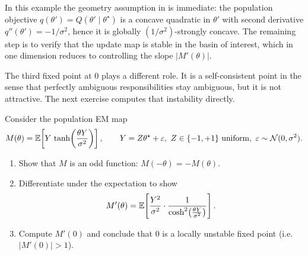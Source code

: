 \documentclass[11pt]{article}
\newif\ifshowsolutions
\newcommand{\SolutionBox}[2][10]{%
  \ifshowsolutions
    \begin{tcolorbox}[stat221panelgray,title={Solution}]
    #2
    \end{tcolorbox}
  \else
    \begin{tcolorbox}[stat221panelgray,unbreakable,title={Workspace}]
    \vspace{#1\baselineskip}
    \end{tcolorbox}
  \fi
}
\begin{document}
In this example the geometry assumption in  is immediate:
the population objective $q(\theta')=Q(\theta'\mid\theta^\star)$ is a concave quadratic in $\theta'$ with second derivative $q''(\theta')=-1/\sigma^2$, hence it is globally $(1/\sigma^2)$-strongly concave.
The remaining step is to verify that the update map is stable in the basin of interest, which in one dimension reduces to controlling the slope $|M'(\theta)|$.

The third fixed point at $0$ plays a different role.
It is a self-consistent point in the sense that perfectly ambiguous responsibilities stay ambiguous, but it is not attractive.
The next exercise computes that instability directly.

\begin{exercise}
\label{ex:gmm-zero-unstable}
Consider the population EM map
\[
M(\theta)=\E\!\left[Y\,\tanh\!\left(\frac{\theta Y}{\sigma^2}\right)\right],
\qquad
Y=Z\theta^\star+\varepsilon,\ Z\in\{-1,+1\}\text{ uniform},\ \varepsilon\sim\mathcal{N}(0,\sigma^2).
\]
\begin{enumerate}[leftmargin=*]
  \item Show that $M$ is an odd function: $M(-\theta)=-M(\theta)$.
  \item Differentiate under the expectation to show
  \[
  M'(\theta)=\mathbb{E}\!\left[\frac{Y^2}{\sigma^2}\cdot \frac{1}{\cosh^2\!\left(\frac{\theta Y}{\sigma^2}\right)}\right].
  \]
  \item Compute $M'(0)$ and conclude that $0$ is a locally unstable fixed point (i.e.\ $|M'(0)|>1$).
\end{enumerate}
\end{exercise}

\SolutionBox[14]{%
\emph{Part (1).}
Using that $\tanh$ is odd,
\[
M(-\theta)
=\E\!\left[Y\,\tanh\!\left(-\frac{\theta Y}{\sigma^2}\right)\right]
=-\E\!\left[Y\,\tanh\!\left(\frac{\theta Y}{\sigma^2}\right)\right]
=-M(\theta).
\]

\emph{Part (2).}
Since $\frac{d}{du}\tanh(u)=\cosh^{-2}(u)$ and $\tanh,\cosh^{-2}$ are bounded, dominated convergence justifies differentiation under the expectation:
\[
M'(\theta)
=\E\!\left[Y\cdot \frac{Y}{\sigma^2}\cdot \frac{1}{\cosh^2\!\left(\frac{\theta Y}{\sigma^2}\right)}\right]
=\E\!\left[\frac{Y^2}{\sigma^2}\cdot \frac{1}{\cosh^2\!\left(\frac{\theta Y}{\sigma^2}\right)}\right].
\]

\emph{Part (3).}
At $\theta=0$, $\cosh^2(0)=1$, so $M'(0)=\E[Y^2]/\sigma^2$.
Under $Y=Z\theta^\star+\varepsilon$ with $Z^2=1$ and $\varepsilon\perp Z$,
\[
\E[Y^2]=\E[(Z\theta^\star+\varepsilon)^2]=(\theta^\star)^2+\sigma^2,
\]
so
\[
M'(0)=\frac{(\theta^\star)^2+\sigma^2}{\sigma^2}=1+\left(\frac{\theta^\star}{\sigma}\right)^2>1.
\]
Hence $0$ is a locally unstable fixed point.%
}
\end{document}
